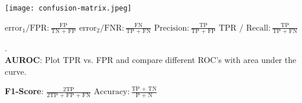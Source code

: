 \begin{multicols*}{2}
	\begin{center}
		\texttt{[image: confusion-matrix.jpeg]}
	\end{center}
	
	$\text{error}_1 / \text{FPR}: \frac{\text{FP}}{\text{TN + FP}}$
	$\text{error}_2 / \text{FNR}: \frac{\text{FN}}{\text{TP + FN}}$
	$\text{Precision}: \frac{\text{TP}}{\text{TP + FP}}$
	$\text{TPR / Recall}: \frac{\text{TP}}{\text{TP + FN}}$
	
\end{multicols*}

.\\[-20pt]
\textbf{AUROC}: Plot TPR vs. FPR and compare different ROC's with area under the curve.

\textbf{F1-Score}: $\frac{2\text{TP}}{2\text{TP + FP + FN}}$ $\text{Accuracy}: \frac{\text{TP + TN}}{\text{P + N}}$
  